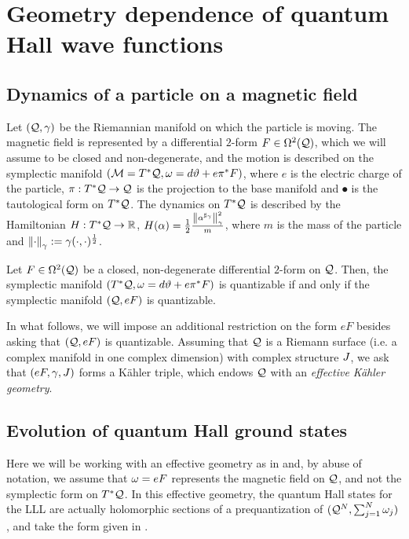 \documentclass[notas.tex]{subfiles} 				%
\begin{document}
\section{Geometry dependence of quantum Hall wave functions} \label{sec_geometry_dependence}

\subsection{Dynamics of a particle on a magnetic field} \label{sec_gq_particle_magnetic} 
Let $(\mathcal{Q}, \gamma)$ be the Riemannian manifold on which the particle is moving. The magnetic field is represented by a differential $2$-form $F \in \Omega^2(\mathcal{Q})$, which we will assume to be closed and non-degenerate, and the motion is described on the symplectic manifold $(\mathcal{M} = T^*\mathcal{Q}, \omega = d\vartheta + e \pi^* F)$, where $e$ is the electric charge of the particle, $\pi: T^*\mathcal{Q} \to \mathcal{Q}$ is the projection to the base manifold and $\spot$ is the tautological form on $T^*\mathcal{Q}$. The dynamics on $T^*\mathcal{Q}$ is described by the Hamiltonian $H: T^*\mathcal{Q} \to \mathbb{R}$, $H(\alpha) = \frac{1}{2}\frac{\left\lVert\alpha^{\sharp_\gamma}\right\rVert_\gamma^2}{m}$,
where $m$ is the mass of the particle and $\left\lVert\cdot\right\rVert_\gamma := \gamma(\cdot, \cdot)^\frac{1}{2}$.

\begin{prop} \label{prop_magnetic_sform}
	Let $F \in \Omega^2(\mathcal{Q})$ be a closed, non-degenerate differential $2$-form on $\mathcal{Q}$. Then, the symplectic manifold $(T^*\mathcal{Q}, \omega = d\vartheta + e \pi^* F)$ is quantizable if and only if the symplectic manifold $(\mathcal{Q}, eF)$ is quantizable.
\end{prop}

\begin{rem} \label{rem_effective_geometry}
	In what follows, we will impose an additional restriction on the form $eF$ besides asking that $(\mathcal{Q}, eF)$ is quantizable. Assuming that $\mathcal{Q}$ is a Riemann surface (i.e. a complex manifold in one complex dimension) with complex structure $J$, we ask that $(eF, \gamma, J)$ forms a Kähler triple, which endows $\mathcal{Q}$ with an \emph{effective Kähler geometry}.
\end{rem}

\subsection{Evolution of quantum Hall ground states} \label{sec_geometry_dependence_overview}
Here we will be working with an effective geometry as in  and, by abuse of notation, we assume that $\omega = eF$ represents the magnetic field on $\mathcal{Q}$, and not the symplectic form on $T^*\mathcal{Q}$. In this effective geometry, the quantum Hall states for the LLL are actually holomorphic sections of a prequantization of $(\mathcal{Q}^N, \sum_{j=1}^{N} \omega_j)$, and take the form given in .
\end{document}

